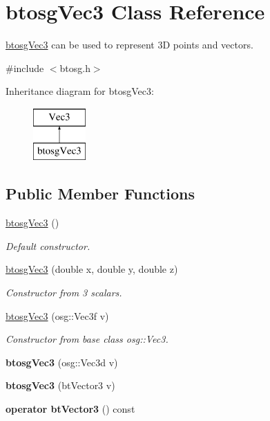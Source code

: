 \hypertarget{classbtosgVec3}{}\section{btosg\+Vec3 Class Reference}
\label{classbtosgVec3}


\hyperlink{classbtosgVec3}{btosg\+Vec3} can be used to represent 3D points and vectors.  




{\ttfamily \#include $<$btosg.\+h$>$}

Inheritance diagram for btosg\+Vec3\+:\begin{figure}[H]
\begin{center}
\leavevmode
\includegraphics[height=2.000000cm]{classbtosgVec3}
\end{center}
\end{figure}
\subsection*{Public Member Functions}
\begin{DoxyCompactItemize}
\item 
\mbox{\label{classbtosgVec3_a3acd9fe06eeea6dfdec4f7dd6a22abc2}} 
\hyperlink{classbtosgVec3_a3acd9fe06eeea6dfdec4f7dd6a22abc2}{btosg\+Vec3} ()
\begin{DoxyCompactList}\small\item\em Default constructor. \end{DoxyCompactList}\item 
\hyperlink{classbtosgVec3_a8bebd055644195494a10937ca754f55b}{btosg\+Vec3} (double x, double y, double z)
\begin{DoxyCompactList}\small\item\em Constructor from 3 scalars. \end{DoxyCompactList}\item 
\hyperlink{classbtosgVec3_a029392a1bc72f7031b8ca99aa814e2a1}{btosg\+Vec3} (osg\+::\+Vec3f v)
\begin{DoxyCompactList}\small\item\em Constructor from base class osg\+::\+Vec3. \end{DoxyCompactList}\item 
\mbox{\label{classbtosgVec3_a34c56d6b0bb27fffa5f4089d7a81b320}} 
{\bfseries btosg\+Vec3} (osg\+::\+Vec3d v)
\item 
\mbox{\label{classbtosgVec3_a2c7014fd9cd67b1918fdf2f53e0d1372}} 
{\bfseries btosg\+Vec3} (bt\+Vector3 v)
\item 
\mbox{\label{classbtosgVec3_a8e9e5bea1a46ba76e213a3f6e5e14dba}} 
{\bfseries operator bt\+Vector3} () const
\end{DoxyCompactItemize}


